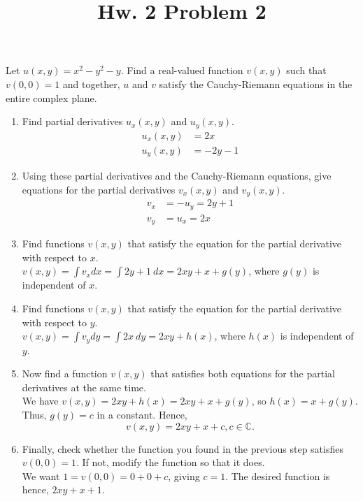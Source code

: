 \documentclass[12pt]{article}
\newcommand{\C}{\mathbb{C}}
\begin{document}
\title{Hw. 2 Problem 2}
\maketitle

Let $u(x,y)=x^2-y^2-y$. Find a real-valued function $v(x,y)$ such that $v(0,0)=1$ and together, $u$ and $v$ satisfy the Cauchy-Riemann equations in the entire complex plane.


\begin{enumerate}
\item Find partial derivatives $u_x(x,y)$ and $u_y(x,y)$.\\
\begin{align*}
u_x(x,y) &= 2x\\
u_y(x,y) &= -2y-1
\end{align*}

\item Using these partial derivatives and the Cauchy-Riemann equations, give equations for the partial derivatives $v_x(x,y)$ and $v_y(x,y)$.\\
\begin{align*}
v_x&=-u_y=2y+1\\
v_y&=u_x=2x
\end{align*}

\item Find functions $v(x,y)$ that satisfy the equation for the partial derivative with respect to $x$.\\

$v(x,y)=\int v_x dx = \int 2y+1\ dx = 2xy+x+g(y)$, where $g(y)$ is independent of $x$.

\item Find functions $v(x,y)$ that satisfy the equation for the partial derivative with respect to $y$.\\

$v(x,y)=\int v_y dy = \int 2x\ dy = 2xy+h(x)$, where $h(x)$ is independent of $y$.

\item Now find a function $v(x,y)$ that satisfies both equations for the partial derivatives at the same time.\\

We have $v(x,y)=2xy+h(x)=2xy+x+g(y)$, so $h(x)=x+g(y)$. Thus, $g(y)=c$ in a constant. Hence, 
$$v(x,y)=2xy+x+c, c\in \C.$$

\item Finally, check whether the function you found in the previous step satisfies $v(0,0)=1$. If not, modify the function so that it does.\\

We want $1=v(0,0)=0+0+c$, giving $c=1$. The desired function is hence, $2xy+x+1$.

\end{enumerate}
\end{document}

